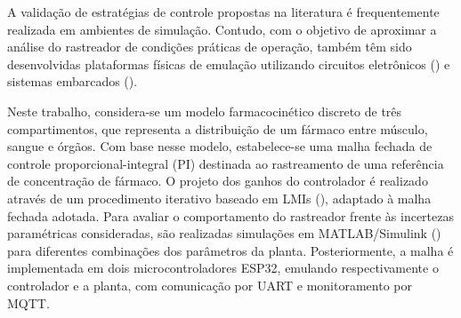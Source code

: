 A validação de estratégias de controle propostas na literatura é frequentemente realizada em ambientes de simulação. Contudo, com o objetivo de aproximar a análise do rastreador de condições práticas de operação, também têm sido desenvolvidas plataformas físicas  de emulação utilizando circuitos eletrônicos (\cite{costa2024designing}) e sistemas embarcados (\cite{desouza2025embedded, oliveira2024preliminary}).

Neste trabalho, considera-se um modelo farmacocinético discreto de três compartimentos, que representa a distribuição de um fármaco entre músculo, sangue e órgãos. Com base nesse modelo, estabelece-se uma malha fechada de controle proporcional-integral (PI) destinada ao rastreamento de uma referência de concentração de fármaco. O projeto dos ganhos do controlador é realizado através de um procedimento iterativo baseado em LMIs (\cite{morais_reference}), adaptado à malha fechada adotada. Para avaliar o comportamento do rastreador frente às incertezas paramétricas consideradas, são realizadas simulações em MATLAB/Simulink (\cite{matlab2016a}) para diferentes combinações dos parâmetros da planta. Posteriormente, a malha é implementada em dois microcontroladores ESP32, emulando respectivamente o controlador e a planta, com comunicação por UART e monitoramento por MQTT.

\newpage